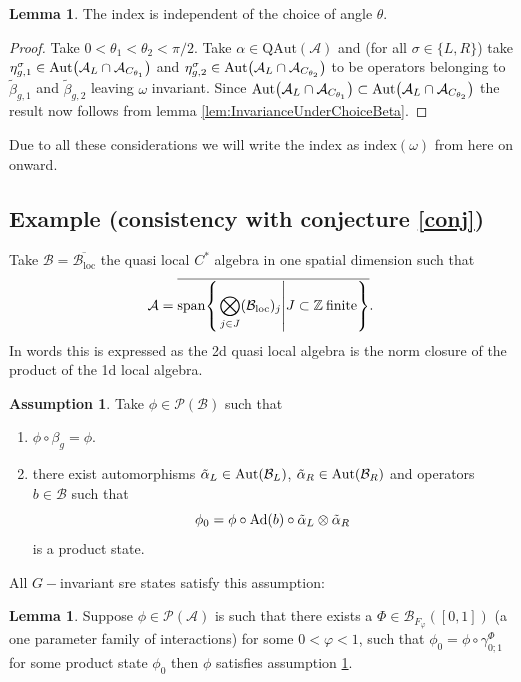 \documentclass[12pt,a4paper,twoside]{article}
\let\originalleft\left
\let\originalright\right
\renewcommand{\left}{\mathopen{}\mathclose\bgroup\originalleft}
\renewcommand{\right}{\aftergroup\egroup\originalright}
\newcommand{\BB}{\mathcal B}
\newcommand{\PP}{\mathcal P}
\newcommand{\ZZ}{\mathbb Z}
\renewcommand{\AA}{\mathcal A}
\newcommand{\Ad}[1]{\textrm{Ad}\left(#1\right)}
\newcommand{\Aut}[1]{\textrm{Aut}\left(#1\right)}
\theoremstyle{definition}
\newtheorem{lemma}[theorem]{Lemma}
\newtheorem{assumption}[theorem]{Assumption}
\numberwithin{equation}{section}
\begin{document}
\begin{lemma}
	The index is independent of the choice of angle $\theta$.
\end{lemma}
\begin{proof}
	Take $0<\theta_1<\theta_2<\pi/2$. Take $\alpha\in \textrm{QAut}(\AA)$ and (for all $\sigma\in\{L,R\}$) take $\eta_{g,1}^\sigma\in\Aut{\AA_L\cap\AA_{C_{\theta_1}}}$ and $\eta_{g,2}^\sigma\in\Aut{\AA_L\cap\AA_{C_{\theta_2}}}$ to be operators belonging to $\tilde{\beta}_{g,1}$ and $\tilde{\beta}_{g,2}$ leaving $\omega$ invariant. Since $\Aut{\AA_L\cap\AA_{C_{\theta_1}}}\subset \Aut{\AA_L\cap\AA_{C_{\theta_2}}}$ the result now follows from lemma \ref{lem:InvarianceUnderChoiceBeta}.
\end{proof}
Due to all these considerations we will write the index as $\textrm{index}(\omega)$ from here on onward.
\subsection{Example (consistency with conjecture \ref{conj})}\label{sec:OneTranslationDirectionExample}
Take $\BB=\overline{\BB_{\text{loc}}}$ the quasi local $C^*$ algebra in one spatial dimension such that
\begin{equation}
	\AA=\overline{\textrm{span}\left\{\left.\bigotimes_{j\in J}(\BB_{\text{loc}})_j\right|J\subset \ZZ\:\text{finite}\right\}}.
\end{equation}
In words this is expressed as the 2d quasi local algebra is the norm closure of the product of the 1d local algebra.
\begin{assumption}\label{assumption1d}
	Take $\phi\in\PP(\BB)$ such that
	\begin{enumerate}
		\item $\phi\circ\beta_g=\phi$.
		\item there exist automorphisms $\tilde\alpha_L\in\Aut{\BB_L}$, $\tilde\alpha_R\in\Aut{\BB_R}$ and operators $b\in\BB$ such that
		\begin{equation}
			\phi_0=\phi\circ\Ad{b}\circ\tilde\alpha_L\otimes\tilde\alpha_R
		\end{equation}
		is a product state.
	\end{enumerate}
\end{assumption}
All $G-$invariant sre states satisfy this assumption:
\begin{lemma}\label{lem:SRE_Implies_Assumption_1d}
	Suppose $\phi\in\PP(\AA)$ is such that there exists a $\Phi\in \BB_{F_\varphi}([0,1])$ (a one parameter family of interactions) for some $0<\varphi<1$, such that $\phi_0=\phi\circ\gamma^\Phi_{0;1}$ for some product state $\phi_0$ then $\phi$ satisfies assumption \ref{assumption1d}.
\end{lemma}
\end{document}
